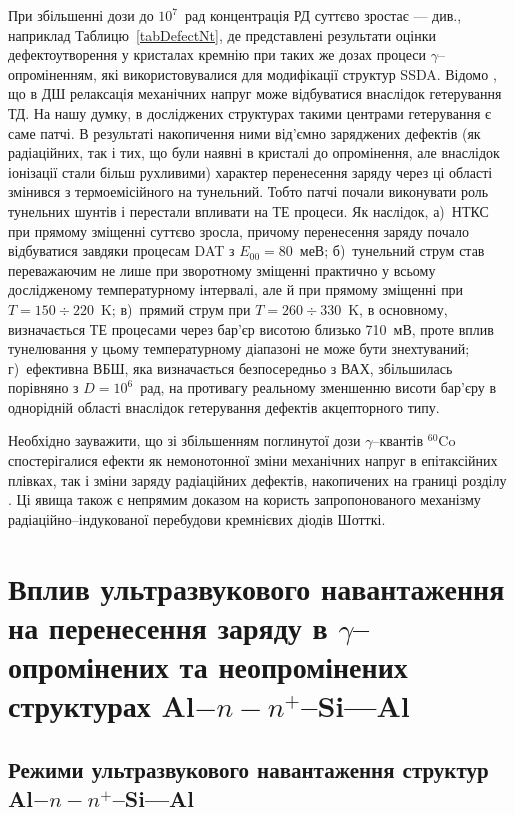 При збільшенні дози до $10^7$~рад концентрація РД суттєво зростає --- див., наприклад Таблицю~\ref{tabDefectNt}, де представлені результати оцінки дефектоутворення
у кристалах кремнію при таких же дозах процеси $\gamma$--опроміненням, які використовувалися для модифікації
структур SSDA.
Відомо \cite{Boltovets}, що в ДШ релаксація механічних напруг може відбуватися внаслідок гетерування ТД.
На нашу думку, в досліджених структурах такими центрами гетерування є саме патчі.
В результаті накопичення ними від'ємно заряджених дефектів (як радіаційних, так і тих, що були наявні в кристалі до опромінення, але внаслідок іонізації
стали більш рухливими) характер перенесення заряду через ці області змінився з термоемісійного на тунельний.
Тобто патчі почали виконувати роль тунельних шунтів і перестали впливати на ТЕ процеси.
Як наслідок,
а)~НТКС при прямому зміщенні суттєво зросла, причому перенесення заряду почало відбуватися завдяки процесам DAT з $E_{00}=80$~меВ;
б)~тунельний струм став переважаючим не лише при зворотному зміщенні практично у всьому дослідженому температурному інтервалі,
але й при прямому зміщенні при $T=150\div220$~K;
в)~прямий струм при $T=260\div330$~K, в основному, визначається ТЕ процесами через бар'єр висотою близько 710~мВ,
проте вплив тунелювання у цьому температурному діапазоні не може бути знехтуваний;
г)~ефективна ВБШ, яка визначається безпосередньо з ВАХ, збільшилась порівняно з  $D=10^6$~рад, на противагу реальному зменшенню висоти бар'єру в однорідній області внаслідок гетерування дефектів акцепторного типу.

Необхідно зауважити, що зі збільшенням поглинутої дози $\gamma$--квантів $^{60}$Co спостерігалися ефекти як немонотонної зміни механічних напруг
в епітаксійних плівках, так і зміни заряду радіаційних дефектів, накопичених на границі розділу \cite{Muzafarova, Belyaev}.
Ці явища також є непрямим доказом на користь запропонованого механізму радіаційно--індукованої перебудови кремнієвих діодів Шотткі.



\section{Вплив ультразвукового навантаження на перенесення заряду в $\gamma$--опромінених та неопромінених структурах Al$-n-n^+$--Si---Al\label{MSSi_USL}}

\subsection{Режими ультразвукового навантаження структур Al$-n-n^+$--Si---Al}

